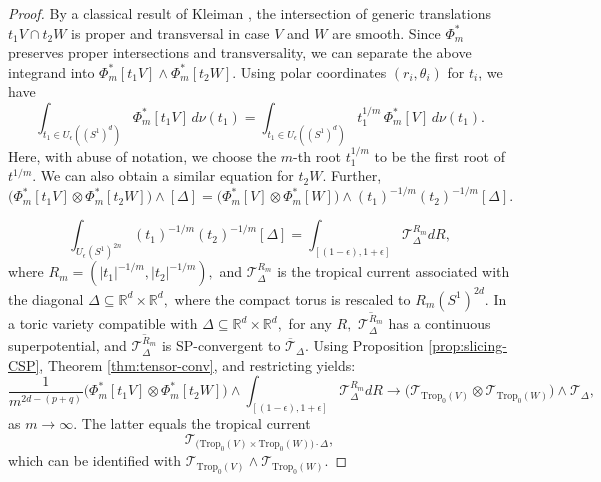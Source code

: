 \documentclass[11pt]{amsart}
\theoremstyle{definition}
\newcommand{\R}{\mathbb{R}}
\newcommand{\lto}{\longrightarrow}
\newcommand{\sT}{\mathscr{T}}
\newcommand{\Trop}{\mathrm{Trop}}
\begin{document}
\begin{proof}
    By a classical result of Kleiman \cite{Kleiman}, the intersection of generic translations $t_1 V \cap  t_2 W$ is proper and transversal in case $V$ and $W$ are smooth. Since $\Phi_m^*$ preserves proper intersections and transversality, we can separate the above integrand into $\Phi_m^*[t_1 V] \wedge \Phi_m^*[t_2 W]$. Using polar coordinates $(r_i, \theta_i)$ for $t_i$, we have
    $$
    \int_{t_1 \in U_{\epsilon}((S^1)^d)} \Phi^*_m[t_1 V] \, d\nu(t_1) = \int_{t_1 \in U_{\epsilon}((S^1)^d)} t_1^{1/m} \, \Phi^*_m[V] \, d\nu(t_1).
    $$
    Here, with abuse of notation, we choose the $m$-th root $t_1^{1/m}$ to be the first root of $t^{1/m}.$ We can also obtain a similar equation for $t_2 W.$ Further, 
    $$
       \big( \Phi_m^*[t_1 V] \otimes \Phi_m^*[t_2 W] ) \wedge [\Delta] = \big(\Phi_m^*[ V] \otimes \Phi_m^*[ W] \big) \wedge  (t_1)^{-1/m} (t_2)^{-1/m}  [\Delta].
    $$   

    $$
    \int_{U_{\epsilon}(S^1)^{2n}} (t_1)^{-1/m} (t_2)^{-1/m}  [\Delta] = \int_{[(1-\epsilon) , 1+\epsilon]} \sT^{R_m}_{\Delta} dR,
    $$
     where $R_m = (|t_1|^{-1/m}, |t_2|^{-1/m}),$ and $\sT^{R_m}_{\Delta}$ is the tropical current associated with the diagonal $\Delta \subseteq \R^d \times \R^d,$ where the compact torus is rescaled to $R_m (S^1)^{2d}.$ In a toric variety compatible with $\Delta \subseteq \R^d \times \R^d,$ for any $R,$ $\overline{\sT^{R_m}_{\Delta}}$ has a continuous superpotential, and $\overline{\sT^{R_m}_{\Delta}}$ is SP-convergent to $\overline{\sT}_{\Delta}.$ Using Proposition \ref{prop:slicing-CSP}, Theorem \ref{thm:tensor-conv}, and restricting yields:
     $$
      \frac{1}{m^{2d-(p+q)}} \big( \Phi_m^*[t_1 V] \otimes \Phi_m^*[t_2 W] )\wedge  \int_{[(1-\epsilon) , 1+\epsilon]} \sT^{R_m}_{\Delta} dR \lto \big(\sT_{\Trop_0(V)} \otimes \sT_{\Trop_0(W)} \big) \wedge \sT_{\Delta},
     $$
     as $m\to \infty.$ The latter equals the tropical current 
     $$
     \sT_{\big(\Trop_0(V) \times \Trop_0(W) \big)\cdot \Delta}, 
     $$
     which can be identified with $\sT_{\Trop_0(V)} \wedge \sT_{\Trop_0(W)}.$
\end{proof}
\end{document}
